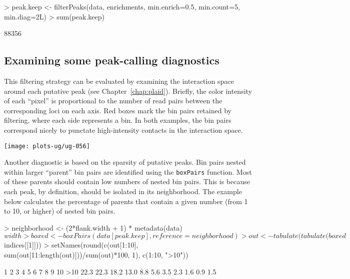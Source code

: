 \documentclass[12pt]{report}
\renewenvironment{Schunk}{\vspace{0pt}}{\vspace{0pt}}
\newcommand{\code}[1]{{\small\texttt{#1}}}
\begin{document}
\begin{Schunk}
\begin{Sinput}
> peak.keep <- filterPeaks(data, enrichments, min.enrich=0.5, min.count=5, min.diag=2L)
> sum(peak.keep)
\end{Sinput}
\begin{Soutput}
[1] 88356
\end{Soutput}
\end{Schunk}

\subsection{Examining some peak-calling diagnostics}
This filtering strategy can be evaluated by examining the interaction space around each putative peak (see Chapter~\ref{chap:plaid}).
Briefly, the color intensity of each ``pixel'' is proportional to the number of read pairs between the corresponding loci on each axis.
Red boxes mark the bin pairs retained by filtering, where each side represents a bin.
In both examples, the bin pairs correspond nicely to punctate high-intensity contacts in the interaction space.

\begin{center}
\texttt{[image: plots-ug/ug-056]}
\end{center}

Another diagnostic is based on the sparsity of putative peaks.
Bin pairs nested within larger ``parent'' bin pairs are identified using the \code{boxPairs} function.
Most of these parents should contain low numbers of nested bin pairs.
This is because each peak, by definition, should be isolated in its neighborhood.
The example below calculates the percentage of parents that contain a given number (from 1 to 10, or higher) of nested bin pairs.

\begin{Schunk}
\begin{Sinput}
> neighborhood <- (2*flank.width + 1) * metadata(data)$width
> boxed <- boxPairs(data[peak.keep], reference=neighborhood)
> out <- tabulate(tabulate(boxed$indices[[1]]))
> setNames(round(c(out[1:10], sum(out[11:length(out)]))/sum(out)*100, 1), c(1:10, ">10"))
\end{Sinput}
\begin{Soutput}
   1    2    3    4    5    6    7    8    9   10  >10 
22.3 22.3 18.2 13.0  8.8  5.6  3.5  2.3  1.6  0.9  1.5 
\end{Soutput}
\end{Schunk}
\end{document}
